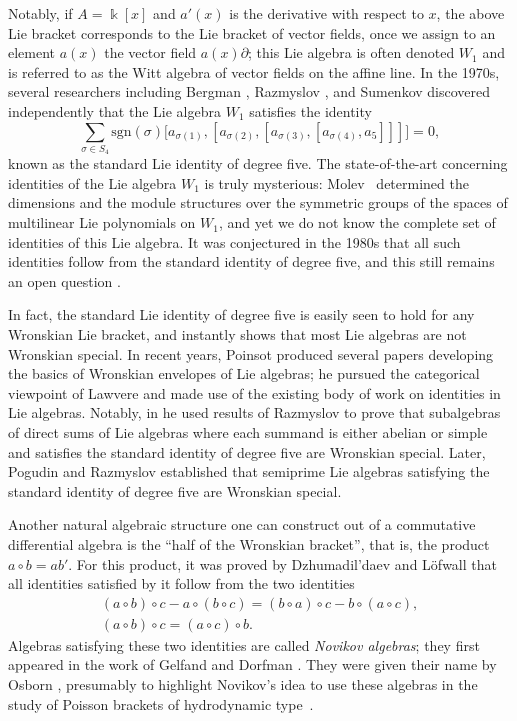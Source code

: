 \documentclass[11pt,reqno]{amsart}
\theoremstyle{plain}
\theoremstyle{definition}
\theoremstyle{remark}
\newcommand{\bk}{\Bbbk}
\newcommand{\sgn}{\mathrm{sgn}}
\begin{document}
Notably, if $A=\bk[x]$ and $a'(x)$ is the derivative with respect to $x$, the above Lie bracket corresponds to the Lie bracket of vector fields, once we assign to an element $a(x)$ the vector field $a(x)\partial$; this Lie algebra is often denoted $W_1$ and is referred to as the Witt algebra of vector fields on the affine line. In the 1970s, several researchers including Bergman \cite{bergman1978}, Razmyslov \cite{MR794957}, and Sumenkov \cite{Sumenkov1976} discovered independently that the Lie algebra $W_1$ satisfies the identity
 \[
\sum_{\sigma \in S_{4}} \sgn(\sigma)
  \bigl[a_{\sigma(1)}, [a_{\sigma(2)}, [a_{\sigma(3)},
  [a_{\sigma(4)}, a_{5}]]]\bigr] = 0,
 \]
known as the standard Lie identity of degree five. The state-of-the-art concerning identities of the Lie algebra $W_1$ is truly mysterious:  Molev~\cite[Th.~1]{Mo} determined the dimensions and the module structures over the symmetric groups of the spaces of multilinear Lie polynomials on $W_1$, and yet we do not know the complete set of identities of this Lie algebra. It was conjectured in the 1980s \cite{MR1099432,MR794957} that all such identities follow from the standard identity of degree five, and this still remains an open question \cite[Sec.~14.3.2]{MR4368864}.  

In fact, the standard Lie identity of degree five is easily seen to hold for any Wronskian Lie bracket, and instantly shows that most Lie algebras are not Wronskian special. In recent years, Poinsot \cite{Poinsot2013,MR3424596,MR3780535} produced several papers developing the basics of Wronskian envelopes of Lie algebras; he pursued the categorical viewpoint of Lawvere and made use of the existing body of work on identities in Lie algebras. Notably, in \cite[Th.~16]{Poinsot2013} he used results of Razmyslov \cite{MR794957} to prove that subalgebras of direct sums of Lie algebras where each summand is either abelian or simple and satisfies the standard identity of degree five are Wronskian special. Later, Pogudin and Razmyslov \cite{MR3550862} established that semiprime Lie algebras satisfying the standard identity of degree five are Wronskian special. 

Another natural algebraic structure one can construct out of a commutative differential algebra is the ``half of the Wronskian bracket'', that is, the product $a\circ b=ab'$. For this product, it was proved by Dzhumadil'daev and Löfwall \cite{DL} that all identities satisfied by it follow from the two identities 
\begin{gather*}
(a\circ b)\circ c-a\circ (b\circ c)=(b\circ a)\circ c-b\circ (a\circ c),\\
(a\circ b)\circ c=(a\circ c)\circ b.
\end{gather*}
Algebras satisfying these two identities are called \emph{Novikov algebras}; they first appeared in the work of Gelfand and Dorfman \cite[\S 6]{GD}. They were given their name by Osborn \cite{Os}, presumably to highlight Novikov's idea to use these algebras in the study of Poisson brackets of hydrodynamic type~\cite{BN}.
\end{document}
